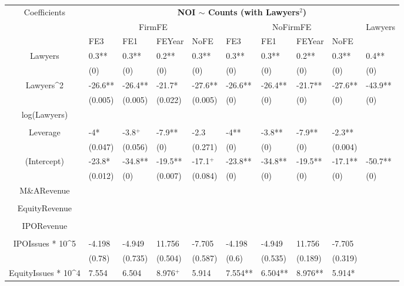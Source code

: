 \documentclass{article}
\begin{document}
\begin{table}[H]
\centering
\begin{tabular}{|clllllllll|}
\hline
\multirow{3}{*}{Coefficients} & \multicolumn{9}{c|}{\textbf{NOI $\sim$ Counts (with Lawyers$^2$)}} \\
\cline{2-10}
& \multicolumn{4}{c}{FirmFE} & \multicolumn{4}{c}{NoFirmFE} & \multirow{2}{*}{Lawyers} \\
\cline{2-9}
& FE3 & FE1 & FEYear & NoFE & FE3 & FE1 & FEYear & NoFE &  \\
\hline
 
Lawyers & 0.3** & 0.3** & 0.2** & 0.3** & 0.3** & 0.3** & 0.2** & 0.3** & 0.4** \\ 
   & (0) & (0) & (0) & (0) & (0) & (0) & (0) & (0) & (0) \\ 
  Lawyers^2 & -26.6** & -26.4** & -21.7* & -27.6** & -26.6** & -26.4** & -21.7** & -27.6** & -43.9** \\ 
   & (0.005) & (0.005) & (0.022) & (0.005) & (0) & (0) & (0) & (0) & (0) \\ 
  log(Lawyers) &  &  &  &  &  &  &  &  &  \\ 
   &  &  &  &  &  &  &  &  &  \\ 
  Leverage & -4* & -3.8$^{+}$ & -7.9** & -2.3 & -4** & -3.8** & -7.9** & -2.3** &  \\ 
   & (0.047) & (0.056) & (0) & (0.271) & (0) & (0) & (0) & (0.004) &  \\ 
  (Intercept) & -23.8* & -34.8** & -19.5** & -17.1$^{+}$ & -23.8** & -34.8** & -19.5** & -17.1** & -50.7** \\ 
   & (0.012) & (0) & (0.007) & (0.084) & (0) & (0) & (0) & (0) & (0) \\ 
  M\&ARevenue &  &  &  &  &  &  &  &  &  \\ 
   &  &  &  &  &  &  &  &  &  \\ 
  EquityRevenue &  &  &  &  &  &  &  &  &  \\ 
   &  &  &  &  &  &  &  &  &  \\ 
  IPORevenue &  &  &  &  &  &  &  &  &  \\ 
   &  &  &  &  &  &  &  &  &  \\ 
  IPOIssues * 10^5 & -4.198 & -4.949 & 11.756 & -7.705 & -4.198 & -4.949 & 11.756 & -7.705 &  \\ 
   & (0.78) & (0.735) & (0.504) & (0.587) & (0.6) & (0.535) & (0.189) & (0.319) &  \\ 
  EquityIssues * 10^4 & 7.554 & 6.504 & 8.976$^{+}$ & 5.914 & 7.554** & 6.504** & 8.976** & 5.914* &  \\ 

\end{tabular}
\end{table}
\end{document}
